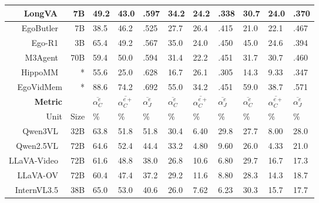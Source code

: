 \begin{table}[htbp]
\begin{tabular}{r|r|p{0.4cm}<{\centering}p{0.4cm}<{\centering}p{0.5cm}<{\centering}|p{0.4cm}<{\centering}p{0.4cm}<{\centering}p{0.5cm}<{\centering}|p{0.4cm}<{\centering}p{0.4cm}<{\centering}p{0.5cm}<{\centering}}
        LongVA~\cite{zhang2024LongVA} & 7B & 49.2        & 43.0  & .597  & 34.2        & 24.2        & .338  & 30.7        & 24.0  & .370 \\
        \hline
        EgoButler~\cite{yang2025EgoLife} & 7B &38.5 &46.2 &.525 & 27.7 & 26.4&.415 &21.0 &22.1  &.467 \\
        Ego-R1~\cite{tian2025EgoR1} & 3B & 65.4 & 49.2 & .567 & 35.0 & 24.0 & .450 & 45.0 & 24.6 & .394 \\
        M3Agent~\cite{long2025M3Agent} & 70B &59.4 &50.0 &.594 &31.4 &22.2 &.451 &31.7 &30.7 &.460 \\
        HippoMM~\cite{lin2025HippoMM} &* &55.6 &25.0 &.628 &16.7 &26.1 & .305 &14.3 &9.33 &.347 \\
        EgoVidMem & * & 88.6 & 74.2 & .692 & 55.0 & 34.2  & .451 & 59.0   & 38.7        & .571  \\ \hline \hline
        \textbf{Metric} & 
        & $\overline{\alpha^e_C}$ & $\overline{\alpha^{e+}_C} $ & $\overline{\alpha^e_J}$
        & $\overline{\alpha^e_C}$ & $\overline{\alpha^{e+}_C} $ & $\overline{\alpha^e_J}$
        & $\overline{\alpha^e_C}$ & $\overline{\alpha^{e+}_C} $ & $\overline{\alpha^e_J}$ \\
        Unit & Size
        & \% & \% & \%
        & \% & \% & \%
        & \% & \% & \% \\ \hline
        Qwen3VL~\cite{yang2025Qwen3} & 32B & 63.8        & 51.8        & 51.8        & 30.4        & 6.40 & 29.8        & 27.7        & 8.00   & 28.0 \\
        Qwen2.5VL~\cite{qwen2025Qwen25} & 72B & 64.6        & 52.4        & 44.4        & 33.2        & 4.80 & 9.60 & 26.0  & 4.33        & 21.0 \\
        LLaVA-Video~\cite{zhang2025LLaVAVideo} & 72B & 61.6        & 48.8        & 38.0  & 26.8        & 10.6        & 6.80 & 29.7        & 16.7        & 17.3 \\
        LLaVA-OV~\cite{li2024LLaVAOneVision} & 72B & 60.4        & 47.4        & 37.2        & 29.2        & 11.6        & 8.80 & 28.3        & 14.3        & 18.7 \\
        InternVL3.5~\cite{zhu2025InternVL3} & 38B & 65.0  & 53.0  & 40.6        & 26.0  & 7.62 & 6.23 & 30.3        & 15.7        & 17.7 \\

\end{tabular}
\end{table}
